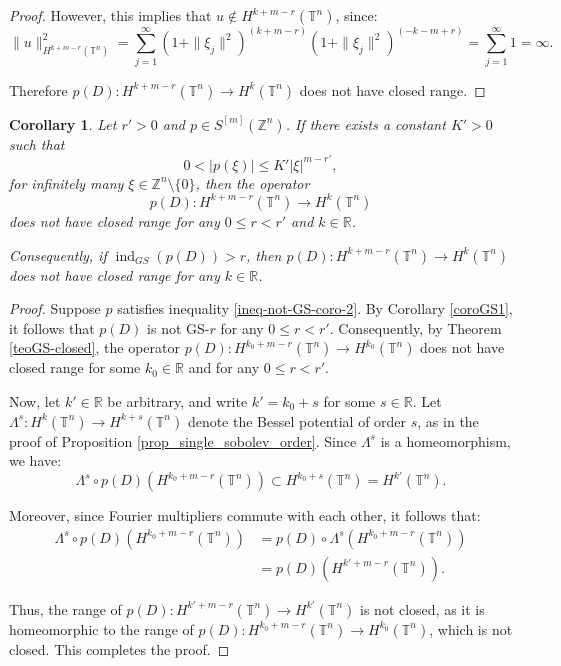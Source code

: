 \documentclass[11pt]{amsart}
\numberwithin{equation}{section}
\newtheorem{corollary}[theorem]{Corollary}
\theoremstyle{definition}
\begin{document}
\begin{proof}
	However, this implies that $ u \notin H^{k + m - r}(\mathbb{T}^n) $, since:
	\[
	\|u\|_{H^{k + m - r}(\mathbb{T}^n)}^2 = \sum_{j=1}^\infty (1 + \|\xi_j\|^2)^{(k + m - r)} (1 + \|\xi_j\|^2)^{(-k - m + r)} = \sum_{j=1}^\infty 1 = \infty.
	\]
	
	Therefore $ p(D): H^{k + m - r}(\mathbb{T}^n) \to H^k(\mathbb{T}^n) $ does not have closed range.
  \end{proof}
  
	\begin{corollary}\label{coro-GS2}
		Let \( r' > 0 \) and \( p \in S^{[m]}(\mathbb{Z}^n) \). 
		If there exists a constant \( K' > 0 \) such that
		\begin{equation}\label{ineq-not-GS-coro-2}
			0 < |p(\xi)| \leq K' |\xi|^{m - r'},
		\end{equation}
		for infinitely many \( \xi \in \mathbb{Z}^n \setminus \{0\} \), then the operator 
		\[ p(D): H^{k + m - r}(\mathbb{T}^n) \to H^k(\mathbb{T}^n) \]
		does not have closed range for any \( 0 \leq r < r' \) and \( k \in \mathbb{R} \).
		
		Consequently, if \( \operatorname{ind}_{GS}(p(D)) > r \), then \( p(D): H^{k + m - r}(\mathbb{T}^n) \to H^k(\mathbb{T}^n) \) does not have closed range for any \( k \in \mathbb{R} \).
	\end{corollary}
	
	\begin{proof}
		Suppose \( p \) satisfies inequality \eqref{ineq-not-GS-coro-2}. By Corollary \ref{coroGS1}, it follows that \( p(D) \) is not GS-\( r \) for any \( 0 \leq r < r' \). Consequently, by Theorem \ref{teoGS-closed}, the operator \( p(D): H^{k_0 + m - r}(\mathbb{T}^n) \to H^{k_0}(\mathbb{T}^n) \) does not have closed range for some \( k_0 \in \mathbb{R} \) and for any \( 0 \leq r < r' \).
		
		Now, let \( k' \in \mathbb{R} \) be arbitrary, and write \( k' = k_0 + s \) for some \( s \in \mathbb{R} \). Let \( \Lambda^s: H^{k}(\mathbb{T}^n) \to H^{k+s}(\mathbb{T}^n) \) denote the Bessel potential of order \( s \), as in the proof of Proposition \ref{prop_single_sobolev_order}. Since \( \Lambda^s \) is a homeomorphism, we have:
		\[
		\Lambda^s \circ p(D)(H^{k_0 + m - r}(\mathbb{T}^n)) \subset H^{k_0 + s}(\mathbb{T}^n) = H^{k'}(\mathbb{T}^n).
		\]
		
		Moreover, since Fourier multipliers commute with each other, it follows that:
		\begin{align*}
			\Lambda^s \circ p(D)(H^{k_0 + m - r}(\mathbb{T}^n)) & = p(D) \circ \Lambda^s(H^{k_0 + m -r} (\mathbb{T}^n)) \\
			&= p(D)(H^{k' + m - r}(\mathbb{T}^n)).			
		\end{align*}

		Thus, the range of \( p(D): H^{k' + m - r}(\mathbb{T}^n) \to H^{k'}(\mathbb{T}^n) \) is not closed, as it is homeomorphic to the range of \( p(D): H^{k_0 + m - r}(\mathbb{T}^n) \to H^{k_0}(\mathbb{T}^n) \), which is not closed. This completes the proof.
	\end{proof}	
\end{document}

